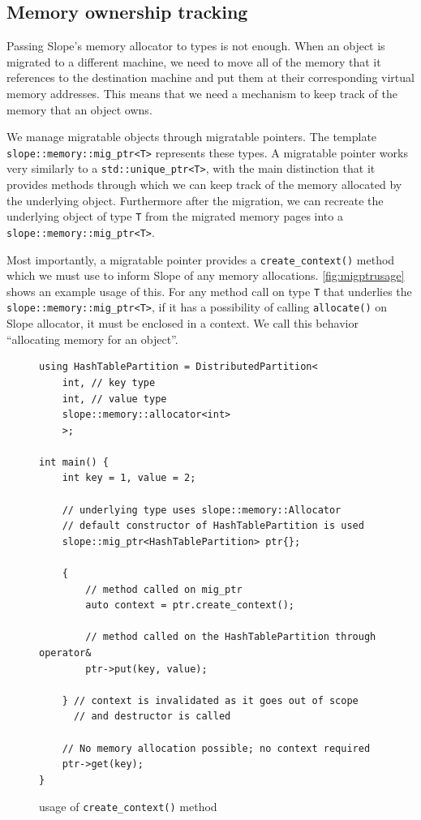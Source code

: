 \subsection{Memory ownership tracking}
\label{sec:ownershiptracking}
Passing Slope's memory allocator to types is not enough.
When an object is migrated to a different machine, we need to move all of the
memory that it references to the destination machine and put them at their
corresponding virtual memory addresses. This means
that we need a mechanism to keep track of the memory that an object owns.

We manage migratable objects through migratable pointers. The template\\
\texttt{slope::memory::mig\_ptr<T>} represents these types. A migratable
pointer works very similarly to a \texttt{std::unique\_ptr<T>}, with the
main distinction that it provides methods through which we can keep track
of the memory allocated by the underlying object. Furthermore after the
migration, we can recreate the underlying object of type \texttt{T} from
the migrated memory pages into a \texttt{slope::memory::mig\_ptr<T>}.

Most importantly, a migratable pointer provides a \texttt{create\_context()}
method which we must use to inform Slope of any memory allocations.
\autoref{fig:migptrusage} shows an example usage of this. For any method call
on type \texttt{T} that underlies the \texttt{slope::memory::mig\_ptr<T>},
if it has a possibility of calling \texttt{allocate()} on Slope allocator, it
must be enclosed in a context. We call this behavior ``allocating memory for
an object''.

\begin{figure}[tp]
\begin{lstlisting}
using HashTablePartition = DistributedPartition<
    int, // key type
    int, // value type
    slope::memory::allocator<int>
    >;

int main() {
    int key = 1, value = 2;

    // underlying type uses slope::memory::Allocator
    // default constructor of HashTablePartition is used
    slope::mig_ptr<HashTablePartition> ptr{};

    {
        // method called on mig_ptr
        auto context = ptr.create_context();

        // method called on the HashTablePartition through operator&
        ptr->put(key, value);

    } // context is invalidated as it goes out of scope
      // and destructor is called

    // No memory allocation possible; no context required
    ptr->get(key);
}
\end{lstlisting}
\caption{
    usage of \texttt{create\_context()} method
}
\label{fig:migptrusage}
\end{figure}


